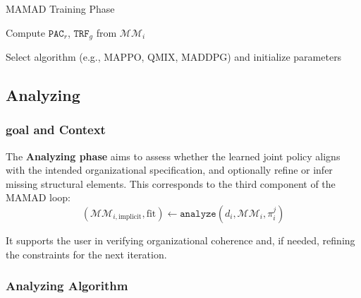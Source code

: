 \documentclass[pdflatex,sn-mathphys-num]{sn-jnl}%
\theoremstyle{thmstyleone}%
\theoremstyle{thmstyletwo}%
\theoremstyle{thmstylethree}%
\begin{document}
\begin{algorithm}[H]
    \caption{MAMAD Training Phase}
    \label{alg:training}
    \DontPrintSemicolon
    
    Compute $\texttt{PAC}_r$, $\texttt{TRF}_g$ from $\mathcal{MM}_i$
    
    Select algorithm (e.g., MAPPO, QMIX, MADDPG) and initialize parameters
    
\end{algorithm}


\subsection{Analyzing}\label{sec:analyzing}

\subsubsection*{goal and Context}

The \textbf{Analyzing phase} aims to assess whether the learned joint policy aligns with the intended organizational specification, and optionally refine or infer missing structural elements. This corresponds to the third component of the MAMAD loop:
\[
    (\mathcal{MM}_{i,\text{implicit}}, \text{fit}) \gets \texttt{analyze}(d_i, \mathcal{MM}_i, \pi^j_i)
\]

It supports the user in verifying organizational coherence and, if needed, refining the constraints for the next iteration.

\subsubsection*{Analyzing Algorithm}
\end{document}
